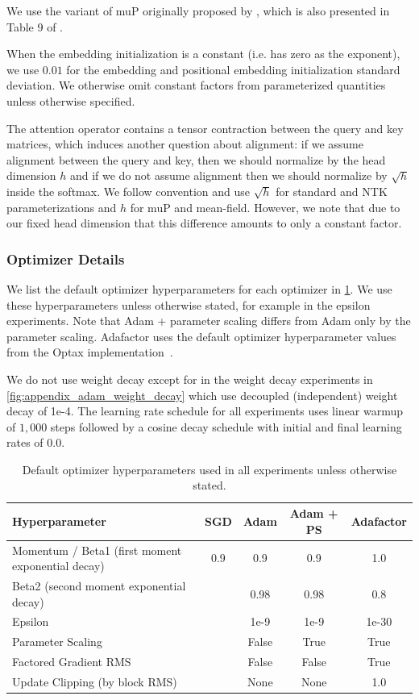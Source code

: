 We use the variant of muP originally proposed by \citet{yang2021tensoriv}, which is also presented in Table 9 of \citet{yang2022tensorv}.

When the embedding initialization is a constant (i.e. has zero as the exponent), we use $0.01$ for the embedding and positional embedding initialization standard deviation. We otherwise omit constant factors from parameterized quantities unless otherwise specified.

The attention operator contains a tensor contraction between the query and key matrices, which induces another question about alignment: if we assume alignment between the query and key, then we should normalize by the head dimension $h$ and if we do not assume alignment then we should normalize by $\sqrt{h}$ inside the softmax. We follow convention and use $\sqrt{h}$ for standard and NTK parameterizations and $h$ for muP and mean-field. However, we note that due to our fixed head dimension that this difference amounts to only a constant factor.



\subsubsection{Optimizer Details}
\label{app:optim_details}
We list the default optimizer hyperparameters for each optimizer in \cref{tab:optim_hyperparameters}. We use these hyperparameters unless otherwise stated, for example in the epsilon experiments. Note that Adam + parameter scaling differs from Adam only by the parameter scaling. Adafactor uses the default optimizer hyperparameter values from the Optax implementation~\citep{deepmind2020jax}.

We do not use weight decay except for in the weight decay experiments in \cref{fig:appendix_adam_weight_decay} which use decoupled (independent) weight decay of 1e-4. The learning rate schedule for all experiments uses linear warmup of $1{,}000$ steps followed by a cosine decay schedule with initial and final learning rates of $0.0$.

\begin{table}[h!]
\centering
\caption{Default optimizer hyperparameters used in all experiments unless otherwise stated.}
\label{tab:optim_hyperparameters}
\begin{tabular}{lcccc} %
\toprule
\textbf{Hyperparameter} & \textbf{SGD} & \textbf{Adam} & \textbf{Adam + PS} & \textbf{Adafactor} \\ 
\midrule
Momentum / Beta1 (first moment exponential decay) & 0.9 & 0.9 & 0.9 &  1.0 \\ 
Beta2 (second moment exponential decay) &  & 0.98 & 0.98 & 0.8 \\ 
Epsilon &  & 1e-9 & 1e-9 & 1e-30 \\ 
Parameter Scaling &  & False & True & True \\ 
Factored Gradient RMS &  & False & False & True \\ 
Update Clipping (by block RMS) &  & None & None & 1.0 \\ 
\bottomrule
\end{tabular}
\end{table}
\clearpage
